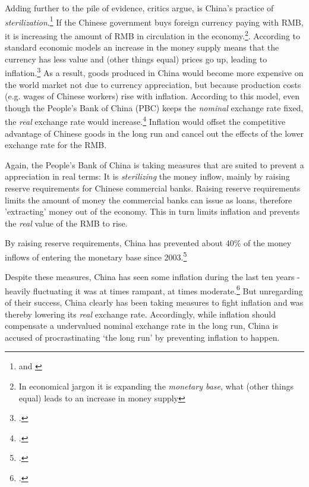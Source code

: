 Adding further to the pile of evidence, critics argue, is China's 
practice of \emph{sterilization}.\footnote{\cite{Humpage2010} and \cite[p. ?]{Wang2011}} If the Chinese government buys foreign 
currency paying with RMB, it is increasing the amount of RMB in 
circulation in the economy.\footnote{In economical jargon it is 
expanding the \emph{monetary base}, what (other things equal) leads to 
an increase in money supply}. According to standard economic 
models an increase in the money 
supply means that the currency has less value and (other things equal) prices go up, leading 
to inflation.\footnote{\cite[pp. 432]{Krugman2008}.}
As a result, goods produced in China would become more expensive on the 
world market not due to currency appreciation, but because production 
costs (e.g. wages of Chinese workers) rise with inflation. According to 
this model, even though the People's Bank of China (PBC) keeps the 
\emph{nominal} exchange rate fixed, the \emph{real} exchange rate would 
increase.\footnote{\cite[p. 509]{Krugman2008}.} Inflation would offset the 
competitive advantage of Chinese goods in the long run and cancel out 
the effects of the lower exchange rate for the RMB.

Again, the People's Bank of China is taking measures that are suited to prevent a appreciation in real terms: It is \emph{sterilizing} the 
money inflow, mainly by raising reserve requirements for Chinese commercial banks. Raising reserve requirements limits the amount of money the commercial 
banks can issue as loans, therefore 'extracting' money out of the economy. This 
in turn limits inflation and prevents the \emph{real} value of the RMB to rise. 

By raising reserve requirements, China has prevented about 40\% of the money 
inflows of entering the monetary base since 2003.\footnote{\cite{Humpage2010}.}%

Despite these measures, China has seen some inflation during the last ten years - heavily fluctuating it was at times rampant, at times moderate.\footnote{\cite{Humpage2010}.} But unregarding of their success, China clearly has been taking measures to fight inflation and was thereby lowering its \emph{real} exchange rate. Accordingly, while inflation should compensate a undervalued nominal exchange rate in the long run, China is accused of procrastinating `the long run' by preventing inflation to happen.



